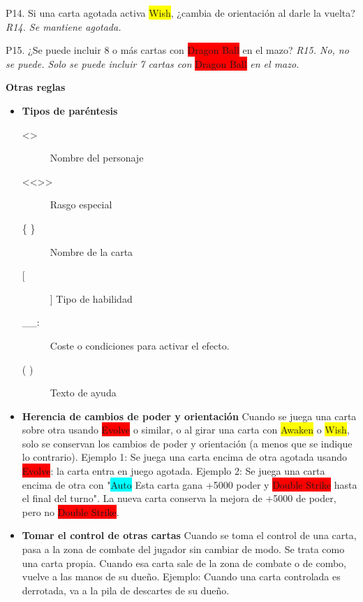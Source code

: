 \documentclass[10pt,a4paper]{article}
\begin{document}
\begin{shaded}
  P14. Si una carta agotada activa \colorbox{yellow}{Wish}, ¿cambia de orientación al darle la vuelta? \newline
  \emph{R14. Se mantiene agotada.} \newline

  P15. ¿Se puede incluir 8 o más cartas con \colorbox{red}{\color{white}Dragon Ball} en el mazo? \newline
  \emph{R15. No, no se puede. Solo se puede incluir 7 cartas con} \colorbox{red}{\color{white}Dragon Ball} \emph{en el mazo.} \newline

\end{shaded}

\begin{shaded}
  \textbf{Otras reglas}

  \begin{itemize}
    \item \textbf{Tipos de paréntesis}
    \begin{description}
      \item [\textless \textgreater] Nombre del personaje
      \item [\textless \textless \textgreater \textgreater] Rasgo especial
      \item [\{ \}] Nombre de la carta
      \item [[ ]] Tipo de habilidad
      \item [\_\_:] Coste o condiciones para activar el efecto.
      \item [( )] Texto de ayuda
    \end{description}

    \item \textbf{Herencia de cambios de poder y orientación} \newline
    Cuando se juega una carta sobre otra usando \colorbox{red}{\color{white}Evolve} o similar, o al girar una carta con \colorbox{yellow}{Awaken} o \colorbox{yellow}{Wish}, solo se conservan los cambios de poder y orientación (a menos que se indique lo contrario).
    Ejemplo 1: Se juega una carta encima de otra agotada usando \colorbox{red}{\color{white}Evolve}: la carta entra en juego agotada.
    Ejemplo 2: Se juega una carta encima de otra con "\colorbox{cyan}{\color{white}Auto} Esta carta gana +5000 poder y \colorbox{red}{\color{white}Double Strike} hasta el final del turno". La nueva carta conserva la mejora de +5000 de poder, pero no \colorbox{red}{\color{white}Double Strike}.

    \item \textbf{Tomar el control de otras cartas} \newline
    Cuando se toma el control de una carta, pasa a la zona de combate del jugador sin cambiar de modo. Se trata como una carta propia. Cuando esa carta sale de la zona de combate o de combo, vuelve a las manos de su dueño.
    Ejemplo: Cuando una carta controlada es derrotada, va a la pila de descartes de su dueño.


\end{itemize}
\end{shaded}
\end{document}
